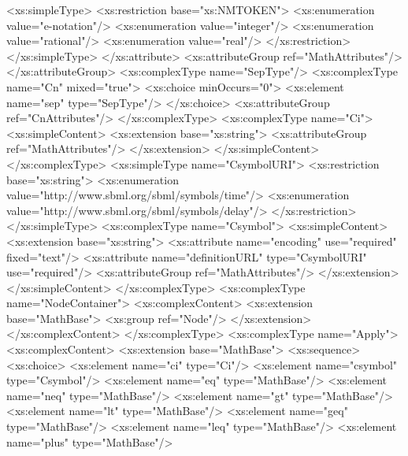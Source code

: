 \begin{example}
\begin{footnotesize}
            <xs:simpleType>
                <xs:restriction base="xs:NMTOKEN">
                    <xs:enumeration value="e-notation"/>
                    <xs:enumeration value="integer"/>
                    <xs:enumeration value="rational"/>
                    <xs:enumeration value="real"/>
                </xs:restriction>
            </xs:simpleType>
        </xs:attribute>
        <xs:attributeGroup ref="MathAttributes"/>
    </xs:attributeGroup>
    <xs:complexType name="SepType"/>
    <xs:complexType name="Cn" mixed="true">
        <xs:choice minOccurs="0">
            <xs:element name="sep" type="SepType"/>
        </xs:choice>
        <xs:attributeGroup ref="CnAttributes"/>
    </xs:complexType>
    <xs:complexType name="Ci">
        <xs:simpleContent>
            <xs:extension base="xs:string">
                <xs:attributeGroup ref="MathAttributes"/>
            </xs:extension>
        </xs:simpleContent>
    </xs:complexType>
    <xs:simpleType name="CsymbolURI">
        <xs:restriction base="xs:string">
            <xs:enumeration value="http://www.sbml.org/sbml/symbols/time"/>
            <xs:enumeration value="http://www.sbml.org/sbml/symbols/delay"/>
        </xs:restriction>
    </xs:simpleType>
    <xs:complexType name="Csymbol">
        <xs:simpleContent>
            <xs:extension base="xs:string">
                <xs:attribute name="encoding" use="required" fixed="text"/>
                <xs:attribute name="definitionURL" type="CsymbolURI" use="required"/>
                <xs:attributeGroup ref="MathAttributes"/>
            </xs:extension>
        </xs:simpleContent>
    </xs:complexType>
    <xs:complexType name="NodeContainer">
        <xs:complexContent>
            <xs:extension base="MathBase">
                <xs:group ref="Node"/>
            </xs:extension>
        </xs:complexContent>
    </xs:complexType>
    <xs:complexType name="Apply">
        <xs:complexContent>
            <xs:extension base="MathBase">
                <xs:sequence>
                    <xs:choice>
                        <xs:element name="ci" type="Ci"/>
                        <xs:element name="csymbol" type="Csymbol"/>
                        <xs:element name="eq" type="MathBase"/>
                        <xs:element name="neq" type="MathBase"/>
                        <xs:element name="gt" type="MathBase"/>
                        <xs:element name="lt" type="MathBase"/>
                        <xs:element name="geq" type="MathBase"/>
                        <xs:element name="leq" type="MathBase"/>
                        <xs:element name="plus" type="MathBase"/>

\end{footnotesize}
\end{example}
